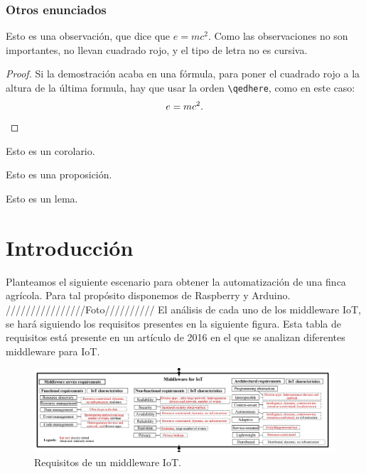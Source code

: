 \documentclass[12pt, twoside]{book}
\begin{document}
\subsection{Otros enunciados}


\begin{remark}
    Esto es una observación, que dice que $e=mc^{2}$. Como las observaciones no son importantes, no llevan cuadrado rojo, y el tipo de letra no es cursiva.
\end{remark}


\begin{proof}
    Si la demostración acaba en una fórmula, para poner el cuadrado rojo a la altura de la última formula, hay que usar la orden \verb|\qedhere|, como en este caso:
    \[
        e=mc^{2}.\qedhere
    \]

\end{proof}


\begin{corollary}\label{cor:1}
    Esto es un corolario.
\end{corollary}

\begin{proposition}\label{pro:1}
    Esto es una proposición.
\end{proposition}

\begin{lemma}[Gauss]\label{lem:1}
    Esto es un lema.
\end{lemma}


\backmatter



\chapter{Introducción}
Planteamos el siguiente escenario para obtener la automatización de una finca agrícola. Para tal propósito disponemos de Raspberry y Arduino.
////////////////Foto//////////
El análisis de cada uno de los middleware IoT, se hará siguiendo los requisitos presentes en la siguiente figura. Esta tabla de requisitos está presente en un artículo de 2016 \cite{surv} en el que se analizan diferentes middleware para IoT.
\begin{figure}[H]
\centering
\includegraphics[scale=0.5]{images/requisitos}
\caption{Requisitos de un middleware IoT.}\label{L105}
\end{figure}
\end{document}
